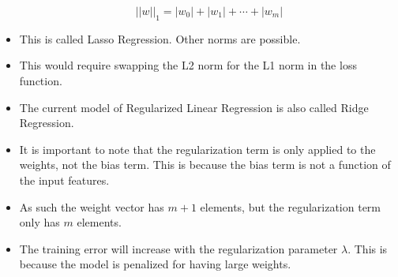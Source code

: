 \documentclass[12pt]{article}
\begin{document}
\begin{itemize}
                \begin{equation}
                    ||w||_1 = |w_0| + |w_1| + \cdots + |w_m|
                \end{equation}
                \item This is called Lasso Regression. Other norms are possible.
                \item This would require swapping the L2 norm for the L1 norm in the loss function.
                \item The current model of Regularized Linear Regression is also called Ridge Regression.
                \item It is important to note that the regularization term is only applied to the weights, not the bias term. This is because the bias term is not a function of the input features.
                \item As such the weight vector has $m + 1$ elements, but the regularization term only has $m$ elements.
                \item The training error will increase with the regularization parameter $\lambda$. This is because the model is penalized for having large weights.
            \end{itemize}
\end{document}
